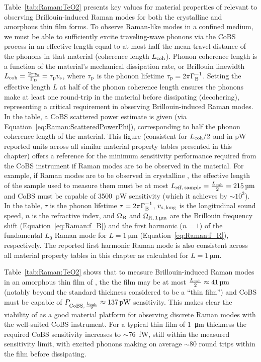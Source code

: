 Table~\ref{tab:Raman:TeO2} presents key values for material properties of  relevant to observing Brillouin-induced Raman modes for both the crystalline and amorphous thin film forms. To observe Raman-like modes in a confined medium, we must be able to sufficiently excite traveling-wave phonons via the \ac{CoBS} process in an effective length equal to at most half the mean travel distance of the phonons in that material (coherence length \(L_{\rm coh}\)). Phonon coherence length is a function of the material's mechanical dissipation rate, or Brillouin linewidth \(L_{\rm coh} = \frac{2\pi v_{\rm s}}{\Gamma_{\rm B}} = \tau_{\rm p}v_{\rm s}\), where \(\tau_{\rm p}\) is the phonon lifetime \(\tau_{\rm p} = 2\pi\Gamma_{\rm B}^{-1}\). Setting the effective length \(L\) at half of the phonon coherence length ensures the phonons make at least one round-trip in the material before dissipating (decohering), representing a critical requirement in observing Brillouin-induced Raman modes. In the table, a \ac{CoBS} scattered power estimate is given (via Equation~\ref{eq:Raman:ScatteredPowerPhi}), corresponding to half the phonon coherence length of the material. This figure (consistent for \(L_{\rm coh}/2\) and in \si{\pico\watt} reported units across all similar material property tables presented in this chapter) offers a reference for the minimum sensitivity performance required from the \ac{CoBS} instrument if Raman modes are to be observed in the material. For example, if Raman modes are to be observed in crystalline , the effective length of the sample used to measure them must be at most \(L_{\rm eff,\,sample} = \frac{L_{\rm coh}}{2} = \SI{215}{\micro\meter}\) and \ac{CoBS} must be capable of \SI{3500}{\pico\watt} sensitivity (which it achieves by \(\sim\)\(10^{3}\)). In the table, \(\tau\) is the phonon lifetime \(\tau = 2\pi\Gamma_{\rm B}^{-1}\), \(v_{\rm s,\,long}\) is the longitudinal sound speed, \(n\) is the refractive index, and \(\Omega_{\rm B}\) and \(\Omega_{\rm R,\,\SI{1}{\micro\meter}}\) are the Brillouin frequency shift (Equation~\ref{eq:Raman:f_B}) and the first harmonic (\(n = 1\)) of the fundamental \(L_{0}\) Raman mode for \(L = \SI{1}{\micro\meter}\) (Equation~\ref{eq:Raman:f_R}), respectively. The reported first harmonic Raman mode is also consistent across all material property tables in this chapter as calculated for \(L = \SI{1}{\micro\meter}\).

Table~\ref{tab:Raman:TeO2} shows that to measure Brillouin-induced Raman modes in an amorphous thin film of , the the film may be at most \(\frac{L_{\rm coh}}{2} \approx \SI{41}{\micro\meter}\) (notably beyond the standard thickness considered to be a ``thin film'') and \ac{CoBS} must be capable of \(P_{\rm CoBS,\,\frac{L_{\rm coh}}{2}} \approx \SI{137}{\pico\watt}\) sensitivity. This makes clear the viability of  as a good material platform for observing discrete Raman modes with the well-suited \ac{CoBS} instrument. For a typical thin film of \SI{1}{\micro\meter} thickness the required \ac{CoBS} sensitivity increases to \(\sim\)\SI{76}{\femto\watt}, still within the measured sensitivity limit, with excited phonons making on average \(\sim\)80 round trips within the film before dissipating.

